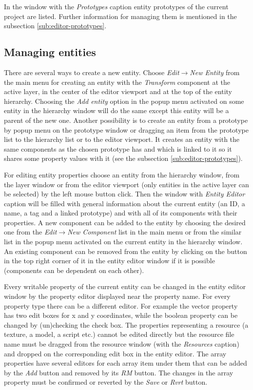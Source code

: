In the window with the \emph{Prototypes} caption entity prototypes of the current project are listed. Further information for managing them is mentioned in the subsection \ref{sub:editor-prototypes}.

\subsection{Managing entities}
\label{sub:editor-entities}

There are several ways to create a new entity. Choose \emph{Edit}$\rightarrow$\emph{New Entity} from the main menu for creating an entity with the \emph{Transform} component at the active layer, in the center of the editor viewport and at the top of the entity hierarchy. Choosing the \emph{Add entity} option in the popup menu activated on some entity in the hierarchy window will do the same except this entity will be a parent of the new one. Another possibility is to create an entity from a prototype by popup menu on the prototype window or dragging an item from the prototype list to the hierarchy list or to the editor viewport. It creates an entity with the same components as the chosen prototype has and which is linked to it so it shares some property values with it (see the subsection \ref{sub:editor-prototypes}).

For editing entity properties choose an entity from the hierarchy window, from the layer window or from the editor viewport (only entities in the active layer can be selected) by the left mouse button click. Then the window with \emph{Entity Editor} caption will be filled with general information about the current entity (an ID, a name, a tag and a linked prototype) and with all of its components with their properties. A new component can be added to the entity by choosing the desired one from the \emph{Edit}$\rightarrow$\emph{New Component} list in the main menu or from the similar list in the popup menu activated on the current entity in the hierarchy window. An existing component can be removed from the entity by clicking on the button in the top right corner of it in the entity editor window if it is possible (components can be dependent on each other).

Every writable property of the current entity can be changed in the entity editor window by the property editor displayed near the property name. For every property type there can be a different editor. For example the vector property has two edit boxes for x and y coordinates, while the boolean property can be changed by (un)checking the check box. The properties representing a resource (a texture, a model, a script etc.) cannot be edited directly but the resource file name must be dragged from the resource window (with the \emph{Resources} caption) and dropped on the corresponding edit box in the entity editor. The array properties have several editors for each array item under them that can be added by the \emph{Add} button and removed by its \emph{RM} button. The changes in the array property must be confirmed or reverted by the \emph{Save} or \emph{Rvrt} button.

